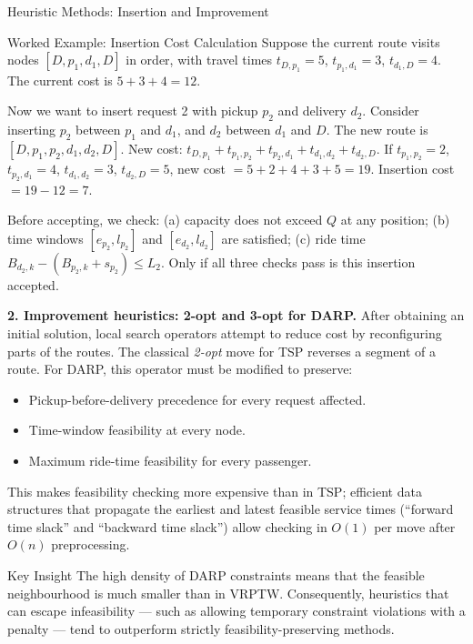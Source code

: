 \documentclass[aspectratio=169,10pt]{beamer}
\begin{document}
\begin{frame}[allowframebreaks]{Heuristic Methods: Insertion and Improvement}
  \framebreak

  \begin{exampleblock}{Worked Example: Insertion Cost Calculation}
    Suppose the current route visits nodes $[D, p_1, d_1, D]$ in order, with
    travel times $t_{D,p_1}=5$, $t_{p_1,d_1}=3$, $t_{d_1,D}=4$.
    The current cost is $5+3+4=12$.

    Now we want to insert request 2 with pickup $p_2$ and delivery $d_2$.
    Consider inserting $p_2$ between $p_1$ and $d_1$, and $d_2$ between
    $d_1$ and $D$.  The new route is $[D, p_1, p_2, d_1, d_2, D]$.
    New cost: $t_{D,p_1}+t_{p_1,p_2}+t_{p_2,d_1}+t_{d_1,d_2}+t_{d_2,D}$.
    If $t_{p_1,p_2}=2$, $t_{p_2,d_1}=4$, $t_{d_1,d_2}=3$, $t_{d_2,D}=5$,
    new cost $= 5+2+4+3+5=19$.  Insertion cost $= 19-12=7$.

    Before accepting, we check: (a) capacity does not exceed $Q$ at any
    position; (b) time windows $[e_{p_2}, l_{p_2}]$ and $[e_{d_2}, l_{d_2}]$
    are satisfied; (c) ride time $B_{d_2,k} - (B_{p_2,k} + s_{p_2}) \leq L_2$.
    Only if all three checks pass is this insertion accepted.
  \end{exampleblock}

  \framebreak

  \textbf{2. Improvement heuristics: 2-opt and 3-opt for DARP.}  After
  obtaining an initial solution, local search operators attempt to reduce
  cost by reconfiguring parts of the routes.  The classical \emph{2-opt}
  move for TSP reverses a segment of a route.  For DARP, this operator must
  be modified to preserve:
  \begin{itemize}
    \item Pickup-before-delivery precedence for every request affected.
    \item Time-window feasibility at every node.
    \item Maximum ride-time feasibility for every passenger.
  \end{itemize}
  This makes feasibility checking more expensive than in TSP; efficient data
  structures that propagate the earliest and latest feasible service times
  (``forward time slack'' and ``backward time slack'') allow checking in
  $O(1)$ per move after $O(n)$ preprocessing.

  \begin{alertblock}{Key Insight}
    The high density of DARP constraints means that the feasible neighbourhood
    is much smaller than in VRPTW.  Consequently, heuristics that can escape
    infeasibility — such as allowing temporary constraint violations with a
    penalty — tend to outperform strictly feasibility-preserving methods.
  \end{alertblock}

\end{frame}
\end{document}
